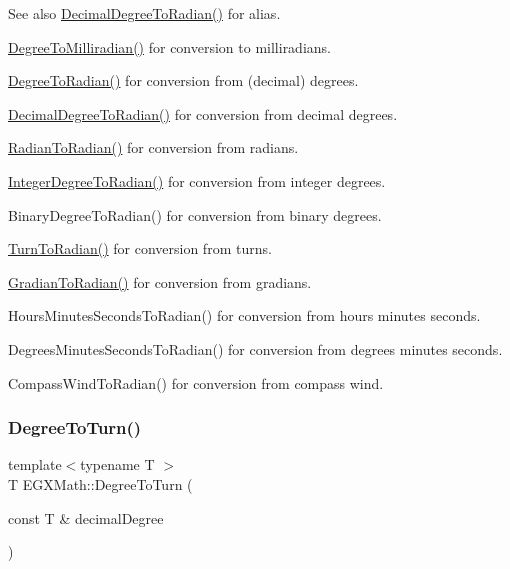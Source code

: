 \begin{DoxySeeAlso}{See also}
\mbox{\hyperlink{group___e_g_x_math-_angle_conversions-_decimal_degree_ga906ee2c83cdf4caa59eb613dc2d5d52a}{Decimal\+Degree\+To\+Radian()}} for alias. 

\mbox{\hyperlink{group___e_g_x_math-_angle_conversions-_degree_gae4fa6c2d3805430760783650cfbfdb11}{Degree\+To\+Milliradian()}} for conversion to milliradians. 

\mbox{\hyperlink{group___e_g_x_math-_angle_conversions-_degree_ga48585541b228c852c9d08a9eac3682f0}{Degree\+To\+Radian()}} for conversion from (decimal) degrees. 

\mbox{\hyperlink{group___e_g_x_math-_angle_conversions-_decimal_degree_ga906ee2c83cdf4caa59eb613dc2d5d52a}{Decimal\+Degree\+To\+Radian()}} for conversion from decimal degrees. 

\mbox{\hyperlink{group___e_g_x_math-_angle_conversions-_radian_gae08681bd86b8e7e4325f6c8cb3a0dc37}{Radian\+To\+Radian()}} for conversion from radians. 

\mbox{\hyperlink{group___e_g_x_math-_angle_conversions-_integer_degree_ga05d3368b00ea27b9895de2ffe5c8df38}{Integer\+Degree\+To\+Radian()}} for conversion from integer degrees. 

Binary\+Degree\+To\+Radian() for conversion from binary degrees. 

\mbox{\hyperlink{group___e_g_x_math-_angle_conversions-_turn_ga72e6d3c46ebfc25f7be5050136d8df16}{Turn\+To\+Radian()}} for conversion from turns. 

\mbox{\hyperlink{group___e_g_x_math-_angle_conversions-_gradian_ga7ea0a6f47a672715b960181606c8fd7b}{Gradian\+To\+Radian()}} for conversion from gradians. 

Hours\+Minutes\+Seconds\+To\+Radian() for conversion from hours minutes seconds. 

Degrees\+Minutes\+Seconds\+To\+Radian() for conversion from degrees minutes seconds. 

Compass\+Wind\+To\+Radian() for conversion from compass wind. 
\end{DoxySeeAlso}
\mbox{\label{group___e_g_x_math-_angle_conversions-_degree_gafb4ce930493a7d6202ede3ee1630ef5d}} 
\subsubsection{\texorpdfstring{Degree\+To\+Turn()}{DegreeToTurn()}}
{\footnotesize\ttfamily template$<$typename T $>$ \\
T E\+G\+X\+Math\+::\+Degree\+To\+Turn (\begin{DoxyParamCaption}\item[{const T \&}]{decimal\+Degree }\end{DoxyParamCaption})}



